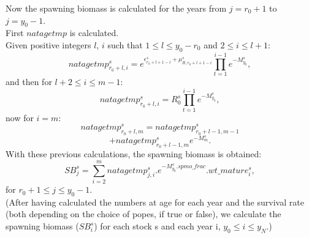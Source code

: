 \documentclass{article}
\begin{document}
Now the spawning biomass is calculated for the years from $j=r_0+1$ to $j=y_0-1$.\\
First $natagetmp$ is calculated.\\
Given positive integers $l$, $i$ such that $1\leq l \leq y_0-r_0$ and $2\leq i \leq l+1$:
\begin{equation}
natagetmp^s_{r_0+l,i}= e^{\epsilon^s_{r_0+l+1-i}+\mu^s_{R,r_0+l+1-i}}\prod_{t=1}^{i-1}e^{-M^s_{y_0}},
\end{equation}
and then for $l+2\leq  i \leq m-1$:
\begin{equation}
natagetmp^s_{r_0+l,i}=R^s_0\prod_{t=1}^{i-1}e^{-M^s_{y_0}},
\end{equation}
now for $i=m$:
\begin{equation}
natagetmp^s_{r_0+l,m}=natagetmp^s_{r_0+l-1,m-1}
\end{equation}
\begin{equation*}
    +natagetmp^s_{r_0+l-1,m}e^{-M^s_{m}}.
\end{equation*}
With these previous calculations, the spawning biomass is obtained:
\begin{equation}
    SB^s_j=\sum_{i=2}^{m}natagetmp^s_{j,i}.e^{-M^s_{y_0}.spmo\_frac}.wt\_mature^s_i,
\end{equation}
for $r_0 +1 \leq j \leq y_0-1$. \\

(After having calculated the numbers at age for each year and the survival rate (both depending on the choice of popes, if true or false), we calculate the spawning biomass ($SB^s_i$) for each stock s and each year i, $y_0 \leq i \leq y_N$.)
\end{document}
